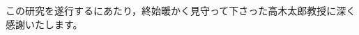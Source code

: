 \begin{center}
    \section*{}                      %
    \vspace*{-2zh}
\end{center}

この研究を遂行するにあたり，終始暖かく見守って下さった高木太郎教授に深く感謝いたします。
